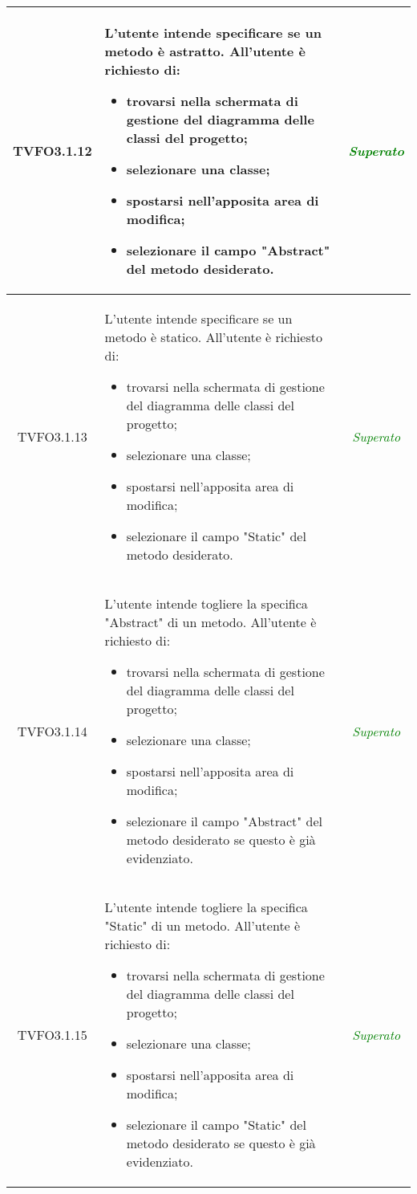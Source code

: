 \begin{longtable}{|c|>{}m{8cm}|c|}
\hypertarget{TVFO3.1.12}{TVFO3.1.12} & L'utente intende specificare se un metodo è astratto.
All'utente è richiesto di:
\begin{itemize}
	\item trovarsi nella schermata di gestione del diagramma delle classi del progetto;
	\item selezionare una classe;
	\item spostarsi nell'apposita area di modifica;
	\item selezionare il campo "Abstract" del metodo desiderato.
\end{itemize} & \textcolor{Green}{\textit{Superato}}\\ \hline

\hypertarget{TVFO3.1.13}{TVFO3.1.13} & L'utente intende specificare se un metodo è statico.
All'utente è richiesto di:
\begin{itemize}
	\item trovarsi nella schermata di gestione del diagramma delle classi del progetto;
	\item selezionare una classe;
	\item spostarsi nell'apposita area di modifica;
	\item selezionare il campo "Static" del metodo desiderato.
\end{itemize} & \textcolor{Green}{\textit{Superato}}\\ \hline

\hypertarget{TVFO3.1.14}{TVFO3.1.14} & L'utente intende togliere la specifica "Abstract" di un metodo.
All'utente è richiesto di:
\begin{itemize}
	\item trovarsi nella schermata di gestione del diagramma delle classi del progetto;
	\item selezionare una classe;
	\item spostarsi nell'apposita area di modifica;
	\item selezionare il campo "Abstract" del metodo desiderato se questo è già evidenziato.
\end{itemize} & \textcolor{Green}{\textit{Superato}}\\ \hline

\hypertarget{TVFO3.1.15}{TVFO3.1.15} & L'utente intende togliere la specifica "Static" di un metodo.
All'utente è richiesto di:
\begin{itemize}
	\item trovarsi nella schermata di gestione del diagramma delle classi del progetto;
	\item selezionare una classe;
	\item spostarsi nell'apposita area di modifica;
	\item selezionare il campo "Static" del metodo desiderato se questo è già evidenziato.
\end{itemize} & \textcolor{Green}{\textit{Superato}}\\ \hline


\end{longtable}
